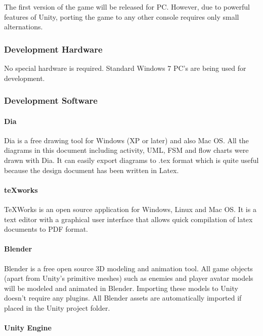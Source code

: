 \documentclass{article}
\begin{document}
The first version of the game will be released for PC.  However, due to powerful features of Unity, porting the game to any other console requires only small alternations.

\subsubsection{Development Hardware}

No special hardware is required.  Standard Windows 7 PC's are being used for development.

\subsubsection{Development Software}

\paragraph{Dia}

Dia is a free drawing tool for Windows (XP or later) and also Mac OS. All the diagrams in this document including activity, UML, FSM and flow charts were drawn with Dia. It can easily export diagrams to .tex format which is quite useful because the design document has been written in Latex.

\paragraph{teXworks}

TeXWorks is an open source application for Windows, Linux and Mac OS.  It is a text editor with a graphical user interface that allows quick compilation of latex documents to PDF format.

\paragraph{Blender}

Blender is a free open source 3D modeling and animation tool.  All game objects (apart from Unity's primitive meshes) such as enemies and player avatar models will be modeled and animated in Blender.  Importing these models to Unity doesn’t require any plugins.  All Blender assets are automatically imported if placed in the Unity project folder.

\paragraph{Unity Engine}
\end{document}
